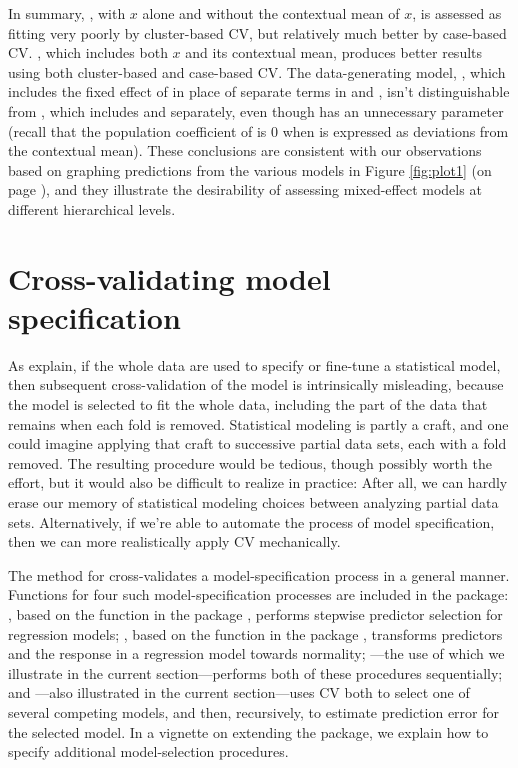 \documentclass[
]{jss}
\begin{document}
In summary, , with \(x\) alone and without the contextual
mean of \(x\), is assessed as fitting very poorly by cluster-based CV,
but relatively much better by case-based CV. , which
includes both \(x\) and its contextual mean, produces better results
using both cluster-based and case-based CV. The data-generating model,
, which includes the fixed effect of  in place
of separate terms in  and , isn't distinguishable from
, which includes  and  separately, even
though  has an unnecessary parameter (recall that the
population coefficient of  is 0 when  is expressed as
deviations from the contextual mean). These conclusions are consistent
with our observations based on graphing predictions from the various
models in Figure \ref{fig:plot1} (on page \pageref{fig:plot1}), and they
illustrate the desirability of assessing mixed-effect models at
different hierarchical levels.

\section{Cross-validating model
specification}\label{cross-validating-model-specification}

As \citet[Sec. 7.10.2: ``The Wrong and Right Way to Do
Cross-validation'']{HastieTibshiraniFriedman:2009} explain, if the whole
data are used to specify or fine-tune a statistical model, then
subsequent cross-validation of the model is intrinsically misleading,
because the model is selected to fit the whole data, including the part
of the data that remains when each fold is removed. Statistical modeling
is partly a craft, and one could imagine applying that craft to
successive partial data sets, each with a fold removed. The resulting
procedure would be tedious, though possibly worth the effort, but it
would also be difficult to realize in practice: After all, we can hardly
erase our memory of statistical modeling choices between analyzing
partial data sets. Alternatively, if we're able to automate the process
of model specification, then we can more realistically apply CV
mechanically.

The  method for  cross-validates a
model-specification process in a general manner. Functions for four such
model-specification processes are included in the package:
, based on the  function in the
 package \citep{VenablesRipley:2002}, performs stepwise
predictor selection for regression models; , based
on the  function in the  package
\citep{FoxWeisberg:2019}, transforms predictors and the response in a
regression model towards normality; ---the
use of which we illustrate in the current section---performs both of
these procedures sequentially; and ---also
illustrated in the current section---uses CV both to select one of
several competing models, and then, recursively, to estimate prediction
error for the selected model. In a vignette on extending the 
package, we explain how to specify additional model-selection
procedures.
\end{document}
